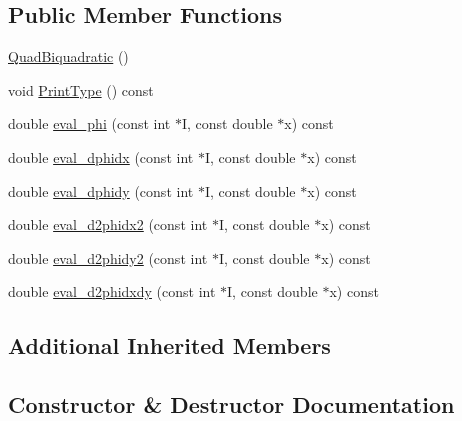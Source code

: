 \subsection*{Public Member Functions}
\begin{DoxyCompactItemize}
\item 
\mbox{\hyperlink{classfemus_1_1_quad_biquadratic_a82f7c6e156c61852201f8970f01e6c75}{Quad\+Biquadratic}} ()
\item 
void \mbox{\hyperlink{classfemus_1_1_quad_biquadratic_a8c9442136145808c695979fdcea1e0fc}{Print\+Type}} () const
\item 
double \mbox{\hyperlink{classfemus_1_1_quad_biquadratic_a3c1cd807c76ac39c05399907b980338c}{eval\+\_\+phi}} (const int $\ast$I, const double $\ast$x) const
\item 
double \mbox{\hyperlink{classfemus_1_1_quad_biquadratic_acbc937c5ad4cda84236ba956b4fb0fae}{eval\+\_\+dphidx}} (const int $\ast$I, const double $\ast$x) const
\item 
double \mbox{\hyperlink{classfemus_1_1_quad_biquadratic_a7d6d24b6ee89e663854d562d573dd3ba}{eval\+\_\+dphidy}} (const int $\ast$I, const double $\ast$x) const
\item 
double \mbox{\hyperlink{classfemus_1_1_quad_biquadratic_ab88f608bc7d87d9639250d165ebafc4e}{eval\+\_\+d2phidx2}} (const int $\ast$I, const double $\ast$x) const
\item 
double \mbox{\hyperlink{classfemus_1_1_quad_biquadratic_a53f8f00fa4999cb1cfcdaf3f6a98df24}{eval\+\_\+d2phidy2}} (const int $\ast$I, const double $\ast$x) const
\item 
double \mbox{\hyperlink{classfemus_1_1_quad_biquadratic_aff6de056034d2ef2d51f914a872a8d93}{eval\+\_\+d2phidxdy}} (const int $\ast$I, const double $\ast$x) const
\end{DoxyCompactItemize}
\subsection*{Additional Inherited Members}


\subsection{Constructor \& Destructor Documentation}
\mbox{\label{classfemus_1_1_quad_biquadratic_a82f7c6e156c61852201f8970f01e6c75}} 
